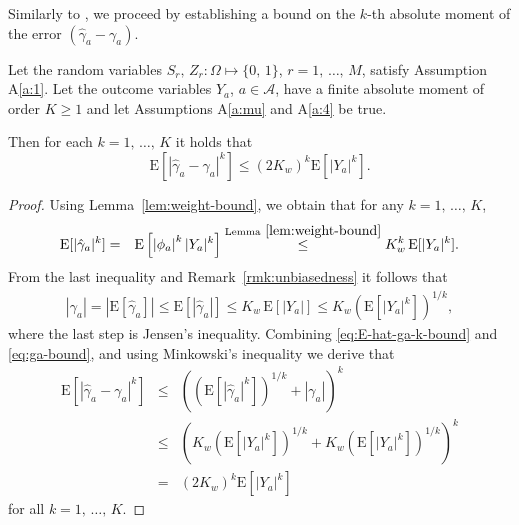 \documentclass[sigconf,nonacm]{acmart}
\newcommand{\E}{\mathrm E}
\begin{document}
Similarly to \cite[Lemma~A.3]{harshaw2023erl}, we proceed by establishing a bound on the $k$-th absolute moment of the error $(\hat\gamma_a - \gamma_a)$.
\begin{lemma}\label{lem:kth-abs-moment-bound}
    Let the random variables $S_r,\,Z_r\colon\Omega\mapsto\{0,\,1\}$, $r=1,\,\ldots,\,M$, satisfy Assumption A\ref{a:1}. Let the outcome variables $Y_a$, $a\in\mathcal{A}$, have a finite absolute moment of order $K\ge 1$ and let Assumptions A\ref{a:mu} and A\ref{a:4} be true.

    Then for each $k=1,\,\ldots,\,K$ it holds that
    \begin{equation*}
        \E[|\hat\gamma_a-\gamma_a|^k] \le \left(2K_w\right)^k \E[|Y_a|^k].
    \end{equation*}
\end{lemma}
\begin{proof}
    Using Lemma~\ref{lem:weight-bound}, we obtain that for any $k=1,\,\ldots,\,K$,
    \begin{eqnarray}\label{eq:E-hat-ga-k-bound}
        \E[|\hat\gamma_a|^k] &=& \E\left[\left|\phi_a\right|^k|Y_a|^k\right]
        \stackrel{\textup{Lemma}~\ref{lem:weight-bound}}{\le} K_w^k\,\E[|Y_a|^k].
    \end{eqnarray}
    From the last inequality and Remark~\ref{rmk:unbiasedness} it follows that
    \begin{eqnarray}\label{eq:ga-bound}
        |\gamma_a| = |\E[\hat\gamma_a]| \le \E[|\hat\gamma_a|] \le K_w\,\E[|Y_a|] \le K_w\left(\E[|Y_a|^k]\right)^{1/k},
    \end{eqnarray}
    where the last step is Jensen's inequality. Combining \eqref{eq:E-hat-ga-k-bound} and \eqref{eq:ga-bound}, and using Minkowski's inequality we derive that
    \begin{eqnarray*}
        \E[|\hat\gamma_a-\gamma_a|^k] &\le& \left(\left(\E[|\hat\gamma_a|^k]\right)^{1/k} + |\gamma_a|\right)^{k}\\
        &\le& \left(K_w\left(\E[|Y_a|^k]\right)^{1/k}+K_w\left(\E[|Y_a|^k]\right)^{1/k}\right)^k\\
        &=& \left(2K_w\right)^k\E[|Y_a|^k]
    \end{eqnarray*}
    for all $k=1,\,\ldots,\,K$.
\end{proof}
\end{document}
